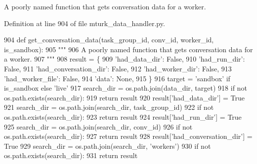 \begin{DoxyVerb}A poorly named function that gets conversation data for a worker.
\end{DoxyVerb}
 

Definition at line 904 of file mturk\+\_\+data\+\_\+handler.\+py.


\begin{DoxyCode}
904     \textcolor{keyword}{def }get\_conversation\_data(task\_group\_id, conv\_id, worker\_id, is\_sandbox):
905         \textcolor{stringliteral}{"""}
906 \textcolor{stringliteral}{        A poorly named function that gets conversation data for a worker.}
907 \textcolor{stringliteral}{        """}
908         result = \{
909             \textcolor{stringliteral}{'had\_data\_dir'}: \textcolor{keyword}{False},
910             \textcolor{stringliteral}{'had\_run\_dir'}: \textcolor{keyword}{False},
911             \textcolor{stringliteral}{'had\_conversation\_dir'}: \textcolor{keyword}{False},
912             \textcolor{stringliteral}{'had\_worker\_dir'}: \textcolor{keyword}{False},
913             \textcolor{stringliteral}{'had\_worker\_file'}: \textcolor{keyword}{False},
914             \textcolor{stringliteral}{'data'}: \textcolor{keywordtype}{None},
915         \}
916         target = \textcolor{stringliteral}{'sandbox'} \textcolor{keywordflow}{if} is\_sandbox \textcolor{keywordflow}{else} \textcolor{stringliteral}{'live'}
917         search\_dir = os.path.join(data\_dir, target)
918         \textcolor{keywordflow}{if} \textcolor{keywordflow}{not} os.path.exists(search\_dir):
919             \textcolor{keywordflow}{return} result
920         result[\textcolor{stringliteral}{'had\_data\_dir'}] = \textcolor{keyword}{True}
921         search\_dir = os.path.join(search\_dir, task\_group\_id)
922         \textcolor{keywordflow}{if} \textcolor{keywordflow}{not} os.path.exists(search\_dir):
923             \textcolor{keywordflow}{return} result
924         result[\textcolor{stringliteral}{'had\_run\_dir'}] = \textcolor{keyword}{True}
925         search\_dir = os.path.join(search\_dir, conv\_id)
926         \textcolor{keywordflow}{if} \textcolor{keywordflow}{not} os.path.exists(search\_dir):
927             \textcolor{keywordflow}{return} result
928         result[\textcolor{stringliteral}{'had\_conversation\_dir'}] = \textcolor{keyword}{True}
929         search\_dir = os.path.join(search\_dir, \textcolor{stringliteral}{'workers'})
930         \textcolor{keywordflow}{if} \textcolor{keywordflow}{not} os.path.exists(search\_dir):
931             \textcolor{keywordflow}{return} result

\end{DoxyCode}
